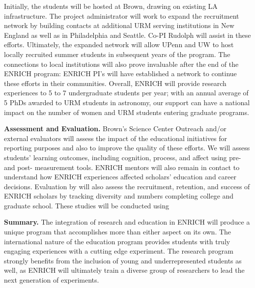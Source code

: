 \documentclass[preprint,11pt]{aastex}
\begin{document}
Initially, the students will be hosted at Brown, drawing on existing LA infrastructure.  
The project administrator will work to expand the recruitment network by building contacts at additional URM serving institutions in New England as well as in Philadelphia and Seattle.  Co-PI Rudolph will assist in these efforts.  Ultimately, the expanded network will allow UPenn and UW to host locally recruited summer students in subsequent years of the program.  The connections to local institutions will also prove invaluable after the end of the ENRICH program: 
ENRICH PI's will have established a network to continue these efforts in their communities.
Overall, ENRICH will provide research experiences to 5 to 7 undergraduate students per year; with an annual average of 5 PhDs awarded to URM students in astronomy, our support can have a national impact on the number of women and URM students entering graduate programs.

\textbf{Assessment and Evaluation.} 
Brown's Science Center Outreach 
and/or external evaluators
will 
assess the impact of the educational initiatives for reporting purposes and also to improve the quality of these efforts. %
We will assess 
students' learning outcomes, including cognition, 
process,
and affect 
using pre- and post- measurement tools.
ENRICH mentors will also 
remain in contact
to understand how ENRICH experiences affected scholars' education and career decisions.
Evaluation by will also assess the recruitment, retention, and success of ENRICH scholars by tracking 
diversity and numbers %
completing college and graduate school. These studies will be conducted using 

\textbf{Summary.} The integration of research and education in ENRICH will produce a unique program that accomplishes more than either aspect on its own.  The international nature of the education program provides students with truly engaging experiences with a cutting edge experiment.  The research program strongly benefits from the inclusion of young and underrepresented students as well, as ENRICH will ultimately train a diverse group of researchers to lead the next generation of experiments.  

\clearpage
\setcounter{page}{1}
\thispagestyle{empty}


\end{document}

